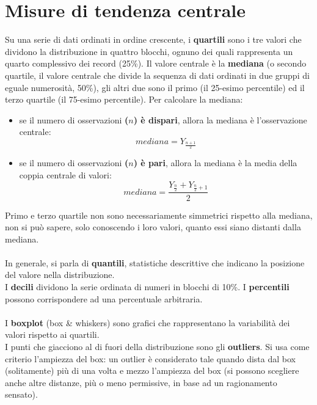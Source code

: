\documentclass[drafts, 10pt]{book}
\begin{document}
\section{Misure di tendenza centrale}
Su una serie di dati ordinati in ordine crescente, i \textbf{quartili} sono i tre valori che dividono la distribuzione in quattro blocchi, ognuno dei quali rappresenta un quarto complessivo dei record (25\%). Il valore centrale è la \textbf{mediana} (o secondo quartile, il valore centrale che divide la sequenza di dati ordinati in due gruppi di eguale numerosità, 50\%), gli altri due sono il primo (il 25-esimo percentile) ed il terzo quartile (il 75-esimo percentile).
Per calcolare la mediana:
\begin{itemize}
    \item se il numero di osservazioni \textbf{($n$) è dispari}, allora la mediana è l'osservazione centrale:
    \begin{equation}
        mediana = Y_{\frac{n+1}{2}}
    \end{equation}
    \item se il numero di osservazioni \textbf{($n$) è pari}, allora la mediana è la media della coppia centrale di valori:
    \begin{equation}
        mediana = \frac{Y_{\frac{n}{2}} + Y_{\frac{n}{2}+1}}{2}
    \end{equation}
\end{itemize}
Primo e terzo quartile non sono necessariamente simmetrici rispetto alla mediana, non si può sapere, solo conoscendo i loro valori, quanto essi siano distanti dalla mediana.
\\
\\
In generale, si parla di \textbf{quantili}, statistiche descrittive che indicano la posizione del valore nella distribuzione.
\\
I \textbf{decili} dividono la serie ordinata di numeri in blocchi di 10\%.
I \textbf{percentili} possono corrispondere ad una percentuale arbitraria.
\\
\\
I \textbf{boxplot} (box \& whiskers) sono grafici che rappresentano la variabilità dei valori rispetto ai quartili.
\\
I punti che giacciono al di fuori della distribuzione sono gli \textbf{outliers}. Si usa come criterio l’ampiezza del box: un outlier è considerato tale quando dista dal box (solitamente) più di una volta e mezzo l’ampiezza del box (si possono scegliere anche altre distanze, più o meno permissive, in base ad un ragionamento sensato).
\end{document}

